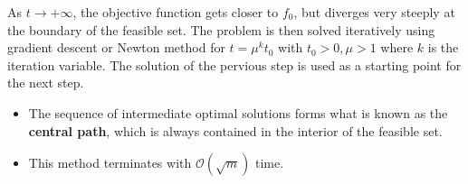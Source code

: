 As $t \to +\infty$, the objective function gets closer to $f_0$, but diverges very steeply at the boundary of the feasible set.
\newpar{}
The problem is then solved iteratively using gradient descent or Newton method for $t=\mu^k t_0$ with $t_0>0, \mu > 1$ where $k$ is the iteration variable. The solution of the pervious step is used as a starting point for the next step.


\newpar{}
\begin{itemize}
    \item The sequence of intermediate optimal solutions forms what is known as the \textbf{central path}, which is always contained in the interior of the feasible set.
    \item This method terminates with $\mathcal{O}(\sqrt{m})$ time.
\end{itemize}

